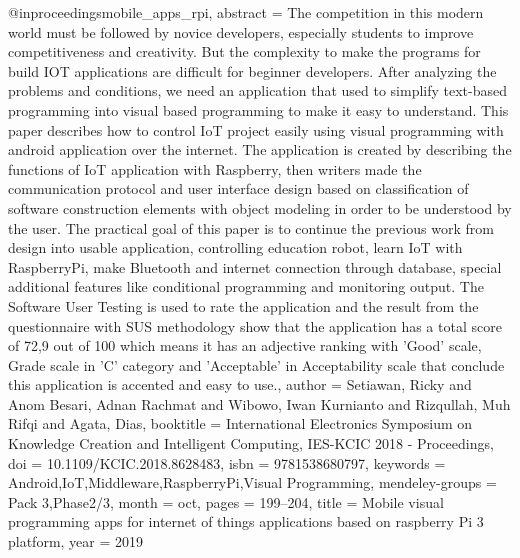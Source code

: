 @inproceedings{mobile_apps_rpi,
    abstract = {The competition in this modern world must be followed by novice developers, especially students to improve competitiveness and creativity. But the complexity to make the programs for build IOT applications are difficult for beginner developers. After analyzing the problems and conditions, we need an application that used to simplify text-based programming into visual based programming to make it easy to understand. This paper describes how to control IoT project easily using visual programming with android application over the internet. The application is created by describing the functions of IoT application with Raspberry, then writers made the communication protocol and user interface design based on classification of software construction elements with object modeling in order to be understood by the user. The practical goal of this paper is to continue the previous work from design into usable application, controlling education robot, learn IoT with RaspberryPi, make Bluetooth and internet connection through database, special additional features like conditional programming and monitoring output. The Software User Testing is used to rate the application and the result from the questionnaire with SUS methodology show that the application has a total score of 72,9 out of 100 which means it has an adjective ranking with 'Good' scale, Grade scale in 'C' category and 'Acceptable' in Acceptability scale that conclude this application is accented and easy to use.},
    author = {Setiawan, Ricky and {Anom Besari}, Adnan Rachmat and Wibowo, Iwan Kurnianto and Rizqullah, Muh Rifqi and Agata, Dias},
    booktitle = {International Electronics Symposium on Knowledge Creation and Intelligent Computing, IES-KCIC 2018 - Proceedings},
    doi = {10.1109/KCIC.2018.8628483},
    isbn = {9781538680797},
    keywords = {Android,IoT,Middleware,RaspberryPi,Visual Programming},
    mendeley-groups = {Pack 3,Phase2/3},
    month = {oct},
    pages = {199--204},
    title = {{Mobile visual programming apps for internet of things applications based on raspberry Pi 3 platform}},
    year = {2019}
}

